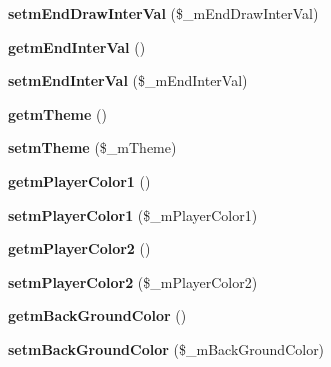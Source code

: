 \begin{DoxyCompactItemize}
{\bfseries setm\+End\+Draw\+Inter\+Val} (\$\+\_\+m\+End\+Draw\+Inter\+Val)
\item 
\mbox{\label{class_reversi_setting_ae9a3d550ba5709f511fcdc3967684816}} 
{\bfseries getm\+End\+Inter\+Val} ()
\item 
\mbox{\label{class_reversi_setting_aa1c85566dde92e56e7b81f2835d0d89e}} 
{\bfseries setm\+End\+Inter\+Val} (\$\+\_\+m\+End\+Inter\+Val)
\item 
\mbox{\label{class_reversi_setting_a4b459d4e6476f142840db591e6d61868}} 
{\bfseries getm\+Theme} ()
\item 
\mbox{\label{class_reversi_setting_a465e8f25ffb52a084c29e71768b6a0a1}} 
{\bfseries setm\+Theme} (\$\+\_\+m\+Theme)
\item 
\mbox{\label{class_reversi_setting_a091d9cd436e68f4c08d26f61fab3a016}} 
{\bfseries getm\+Player\+Color1} ()
\item 
\mbox{\label{class_reversi_setting_a411006ea8845a27f5e33b4a555254d2d}} 
{\bfseries setm\+Player\+Color1} (\$\+\_\+m\+Player\+Color1)
\item 
\mbox{\label{class_reversi_setting_ad60404de7ef938cb3c26804c07abe7f7}} 
{\bfseries getm\+Player\+Color2} ()
\item 
\mbox{\label{class_reversi_setting_a0a0e0d287c262fcc7f2fb27e0d9dbf3a}} 
{\bfseries setm\+Player\+Color2} (\$\+\_\+m\+Player\+Color2)
\item 
\mbox{\label{class_reversi_setting_a540a19fc7d4fb7c17efa3c76403f4061}} 
{\bfseries getm\+Back\+Ground\+Color} ()
\item 
\mbox{\label{class_reversi_setting_ae9013ece88de1d06960aeeafe29b27e7}} 
{\bfseries setm\+Back\+Ground\+Color} (\$\+\_\+m\+Back\+Ground\+Color)
\item 
\mbox{\label{class_reversi_setting_a91454a61fd72638be2703907a8f81a75}} 

\end{DoxyCompactItemize}
